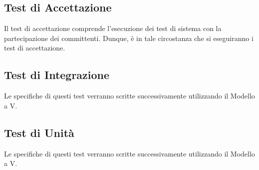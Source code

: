 	\subsection{Test di Accettazione}
	Il test di accettazione comprende l'esecuzione dei test di sistema con la partecipazione dei committenti. Dunque, è in tale circostanza che si eseguiranno i test di accettazione. 
	\subsection{Test di Integrazione}
	Le specifiche di questi test verranno scritte successivamente utilizzando il Modello a V.
	\subsection{Test di Unità}
	Le specifiche di questi test verranno scritte successivamente utilizzando il Modello a V.